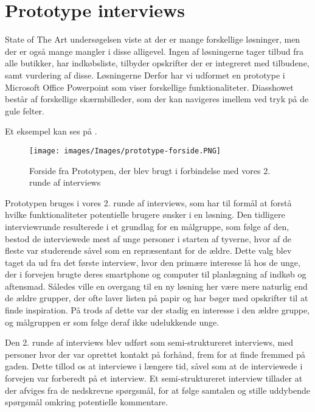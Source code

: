 \section{Prototype interviews}\label{section:interview2}
State of The Art undersøgelsen viste at der er mange forskellige løsninger, men der er også mange mangler i disse alligevel.
Ingen af løsningerne tager tilbud fra alle butikker, har indkøbsliste, tilbyder opskrifter der er integreret med tilbudene, samt vurdering af disse.
Løsningerne
Derfor har vi udformet en prototype i Microsoft Office Powerpoint som viser forskellige funktionaliteter.
Diasshowet består af forskellige skærmbilleder, som der kan navigeres imellem ved tryk på de gule felter.

Et eksempel kan ses på .

\begin{wrapfigure}{o}{0.68\textwidth}
\vspace{-20pt}
	\begin{center}
		\texttt{[image: images/Images/prototype-forside.PNG]}
	\end{center}
	\vspace{-20pt}
	\caption{Forside fra Prototypen, der blev brugt i forbindelse med vores 2. runde af interviews}\label{ss:Prototype}
	\vspace{-20pt}
\end{wrapfigure}

Prototypen bruges i vores 2. runde af interviews, som har til formål at forstå hvilke funktionaliteter potentielle brugere ønsker i en løsning.
Den tidligere interviewrunde resulterede i et grundlag for en målgruppe, som følge af den, bestod de interviewede mest af unge personer i starten af tyverne, hvor af de fleste var studerende såvel som en repræsentant for de ældre.
Dette valg blev taget da ud fra det første interview, hvor den primære interesse lå hos de unge, der i forvejen brugte deres smartphone og computer til planlægning af indkøb og aftensmad.
Således ville en overgang til en ny løsning her være mere naturlig end de ældre grupper, der ofte laver listen på papir og har bøger med opskrifter til at finde inspiration.
På trods af dette var der stadig en interesse i den ældre gruppe, og målgruppen er som følge deraf ikke udelukkende unge.

Den 2. runde af interviews blev udført som semi-struktureret interviews, med personer hvor der var oprettet kontakt på forhånd, frem for at finde fremmed på gaden.
Dette tillod os at interviewe i længere tid, såvel som at de interviewede i forvejen var forberedt på et interview.
Et semi-struktureret interview tillader at der afviges fra de nedskrevne spørgsmål, for at følge samtalen og stille uddybende spørgsmål omkring potentielle kommentare.

